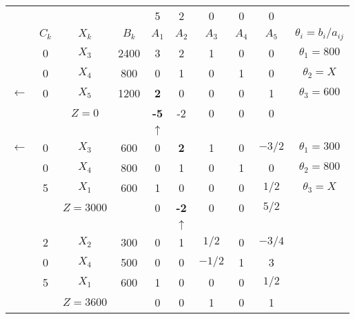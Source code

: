     \begin{tabular}{cccccccccc}
\cline{2-10}            &         &         &         & 5       & 2       & 0       & 0       & 0       &  \bigstrut[t]\\
            & $C_k$   & $X_k$   & $B_k$   & $A_1$   & $A_2$   & $A_3$   & $A_4$   & $A_5$   & $\theta_i = b_i/a_{ij}$ \bigstrut[b]\\
\cline{2-10}            & 0       & $X_3$   & 2400    & 3       & 2       & 1       & 0       & 0       & $\theta_1 = 800$ \bigstrut[t]\\
            & 0       & $X_4$   & 800     & 0       & 1       & 0       & 1       & 0       & $\theta_2 = X$ \\
    $\leftarrow$ & 0       & \textcolor[rgb]{ 1,  0,  0}{\boldmath{}\textbf{$X_5$}\unboldmath{}} & 1200    & \textbf{2} & 0       & 0       & 0       & 1       & \boldmath{}\textbf{$\theta_3 = 600$}\unboldmath{} \bigstrut[b]\\
\cline{2-10}            &         & $Z=0$   &         & \textcolor[rgb]{ 0,  .439,  .753}{\textbf{-5}} & -2      & 0       & 0       & 0       &  \bigstrut\\
\cline{2-10}            &         &         &         & $\uparrow$ &         &         &         &         &  \bigstrut\\
\cline{2-10}    $\leftarrow$ & 0       & \textcolor[rgb]{ 1,  0,  0}{\boldmath{}\textbf{$X_3$}\unboldmath{}} & 600     & 0       & \textbf{2} & 1       & 0       & $-3/2$  & \boldmath{}\textbf{$\theta_1 = 300$}\unboldmath{} \bigstrut[t]\\
            & 0       & $X_4$   & 800     & 0       & 1       & 0       & 1       & 0       & $\theta_2 = 800$ \\
            & 5       & $X_1$   & 600     & 1       & 0       & 0       & 0       & $1/2$   & $\theta_3 = X$ \bigstrut[b]\\
\cline{2-10}            &         & $Z=3000$ &         & 0       & \textcolor[rgb]{ 0,  .439,  .753}{\textbf{-2}} & 0       & 0       & $5/2$   &  \bigstrut\\
\cline{2-10}            &         &         &         &         & $\uparrow$ &         &         &         &  \bigstrut\\
\cline{2-10}            & 2       & $X_2$   & 300     & 0       & 1       & $1/2$   & 0       & $-3/4$  &  \bigstrut[t]\\
            & 0       & $X_4$   & 500     & 0       & 0       & $-1/2$  & 1       & 3       &  \\
            & 5       & $X_1$   & 600     & 1       & 0       & 0       & 0       & $1/2$   &  \bigstrut[b]\\
\cline{2-9}            &         & $Z=3600$ &         & 0       & 0       & 1       & 0       & 1       &  \bigstrut\\
\cline{2-9}    \end{tabular}%
